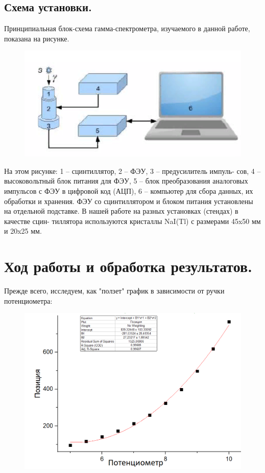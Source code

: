 \documentclass[%
 reprint,
 amsmath,amssymb,
 aps,
]{revtex4-2}
\begin{document}
\subsection{Схема установки.}

Принципиальная блок-схема гамма-спектрометра, изучаемого в данной
работе, показана на рисунке.

\begin{figure}[h!]
\includegraphics[scale=0.42]{1.png}
\end{figure}


На этом рисунке: 1 – сцинтиллятор, 2 – ФЭУ, 3 – предусилитель импуль-
сов,
4 – высоковольтный блок питания для ФЭУ, 5 – блок преобразования
аналоговых импульсов с ФЭУ в цифровой код (АЦП), 6 – компьютер для
сбора данных, их обработки и хранения.
ФЭУ со сцинтиллятором и блоком питания установлены на отдельной
подставке. В нашей работе на разных установках (стендах) в качестве сцин-
тиллятора используются кристаллы NaI(Tl) с размерами 45x50 мм и 
20x25 мм.

\section{Ход работы и обработка результатов.}

Прежде всего, исследуем, как "ползет" график в зависимости от ручки потенциометра:

\begin{figure}[h!]
	\includegraphics[scale=0.45]{2.png}
\end{figure}
\end{document}
